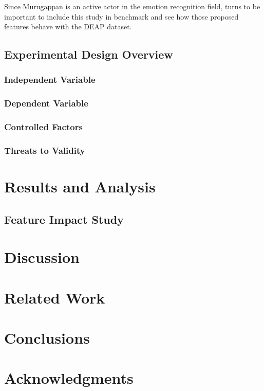 \documentclass{sig-alternate}
\begin{document}
Since Murugappan is an active actor in the emotion recognition field, turns to be important to include this study in benchmark and see how those proposed features behave with the DEAP dataset.




\subsection{Experimental Design Overview}
\subsubsection{Independent Variable}
\subsubsection{Dependent Variable }
\subsubsection{Controlled Factors}
\subsubsection{Threats to Validity}	

\section{Results and Analysis}

\subsection{Feature Impact Study}
\subsection{ }

\section{Discussion}

\section{Related Work}

\section{Conclusions}

\section{Acknowledgments}

%

%
%
\end{document}
